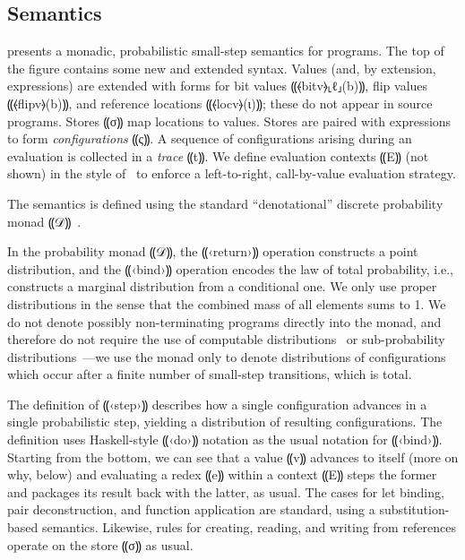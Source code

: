 
\subsection{Semantics}
\label{subsec:obliv-design-sem}

 presents a monadic, probabilistic small-step
semantics for \obliv programs. The top of the figure contains some new and
extended syntax. Values (and, by extension, expressions) are extended with
forms for bit values ⸨⦑bitv⦒⸤ℓ⸥(b)⸩, flip values ⸨⦑flipv⦒(b)⸩, and
reference locations ⸨⦑locv⦒(ι)⸩; these do not appear in source programs. Stores
⸨σ⸩ map locations to values. Stores are paired with expressions to form
\emph{configurations} ⸨ς⸩. A sequence of configurations arising during an
evaluation is collected in a \emph{trace} ⸨t⸩.  We define evaluation
contexts ⸨E⸩ (not shown) in the style of~\citet{felleisen1992revised} to enforce a
left-to-right, call-by-value evaluation strategy.

The semantics is defined using the standard “denotational” discrete probability monad
⸨𝒟⸩~\cite{10.1007/BFb0092872,Ramsey:2002:SLC:503272.503288}.

In the probability monad ⸨𝒟⸩, the ⸨‹return›⸩ operation constructs a point
distribution, and the ⸨‹bind›⸩ operation encodes the law of total probability,
{i.e.}, constructs a marginal distribution from a conditional one. We only use
proper distributions in the sense that the combined mass of all elements sums
to 1. We do not denote possibly non-terminating programs directly into the
monad, and therefore do not require the use of computable
distributions~\cite{huang-computable-distributions} or
sub-probability distributions~\cite{monniaux-ai-prob}—we use the monad only to denote distributions of
configurations which occur after a finite number of small-step transitions,
which is total.

The definition of ⸨‹step›⸩ describes how a single configuration advances in a
single probabilistic step, yielding a distribution of resulting configurations.
The definition uses Haskell-style ⸨‹do›⸩ notation as the usual notation for
⸨‹bind›⸩. Starting from the bottom, we can see that a value ⸨v⸩ advances to
itself (more on why, below) and evaluating a redex ⸨e⸩ within a context ⸨E⸩
steps the former and packages its result back with the latter, as usual. The
cases for let binding, pair deconstruction, and function application are
standard, using a substitution-based semantics. Likewise, rules for creating,
reading, and writing from references operate on the store ⸨σ⸩ as
usual.

